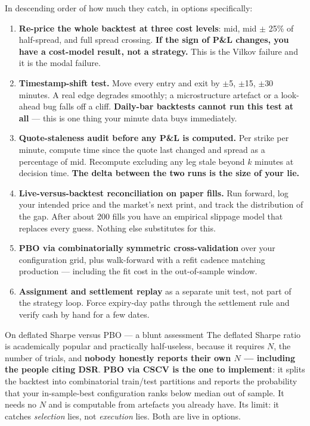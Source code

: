 \documentclass[11pt,a4paper]{article}
\begin{document}
In descending order of how much they catch, in options specifically:

\begin{enumerate}
\item \textbf{Re-price the whole backtest at three cost levels}: mid, mid $\pm$
25\% of half-spread, and full spread crossing. \textbf{If the sign of P\&L
changes, you have a cost-model result, not a strategy.} This is the Vilkov failure
and it is the modal failure.
\item \textbf{Timestamp-shift test.} Move every entry and exit by $\pm$5, $\pm$15,
$\pm$30 minutes. A real edge degrades smoothly; a microstructure artefact or a
look-ahead bug falls off a cliff. \textbf{Daily-bar backtests cannot run this test
at all} --- this is one thing your minute data buys immediately.
\item \textbf{Quote-staleness audit before any P\&L is computed.} Per strike per
minute, compute time since the quote last changed and spread as a percentage of
mid. Recompute excluding any leg stale beyond $k$ minutes at decision time.
\textbf{The delta between the two runs is the size of your lie.}
\item \textbf{Live-versus-backtest reconciliation on paper fills.} Run forward,
log your intended price and the market's next print, and track the distribution of
the gap. After about 200 fills you have an empirical slippage model that replaces
every guess. Nothing else substitutes for this.
\item \textbf{PBO via combinatorially symmetric cross-validation} over your
configuration grid, plus walk-forward with a refit cadence matching production ---
including the fit cost in the out-of-sample window.
\item \textbf{Assignment and settlement replay} as a separate unit test, not part
of the strategy loop. Force expiry-day paths through the settlement rule and
verify cash by hand for a few dates.
\end{enumerate}

\begin{keyfact}{On deflated Sharpe versus PBO --- a blunt assessment}
The deflated Sharpe ratio is academically popular and practically half-useless,
because it requires $N$, the number of trials, and \textbf{nobody honestly reports
their own $N$ --- including the people citing DSR}. \textbf{PBO via CSCV is the
one to implement}: it splits the backtest into combinatorial train/test partitions
and reports the probability that your in-sample-best configuration ranks below
median out of sample. It needs no $N$ and is computable from artefacts you already
have. Its limit: it catches \emph{selection} lies, not \emph{execution} lies. Both
are live in options.
\end{keyfact}
\end{document}

